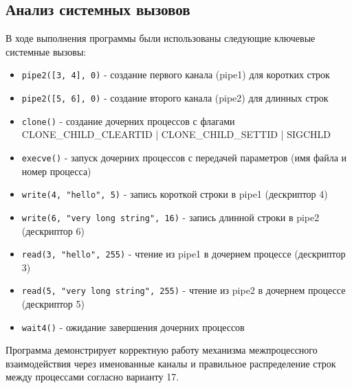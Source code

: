 \subsection{Анализ системных вызовов}

В ходе выполнения программы были использованы следующие ключевые системные вызовы:

\begin{itemize}
    \item \texttt{pipe2([3, 4], 0)} - создание первого канала (pipe1) для коротких строк
    \item \texttt{pipe2([5, 6], 0)} - создание второго канала (pipe2) для длинных строк  
    \item \texttt{clone()} - создание дочерних процессов с флагами CLONE\_CHILD\_CLEARTID | CLONE\_CHILD\_SETTID | SIGCHLD
    \item \texttt{execve()} - запуск дочерних процессов с передачей параметров (имя файла и номер процесса)
    \item \texttt{write(4, "hello", 5)} - запись короткой строки в pipe1 (дескриптор 4)
    \item \texttt{write(6, "very long string", 16)} - запись длинной строки в pipe2 (дескриптор 6)
    \item \texttt{read(3, "hello", 255)} - чтение из pipe1 в дочернем процессе (дескриптор 3)
    \item \texttt{read(5, "very long string", 255)} - чтение из pipe2 в дочернем процессе (дескриптор 5)
    \item \texttt{wait4()} - ожидание завершения дочерних процессов
\end{itemize}

Программа демонстрирует корректную работу механизма межпроцессного взаимодействия через именованные каналы и правильное распределение строк между процессами согласно варианту 17.